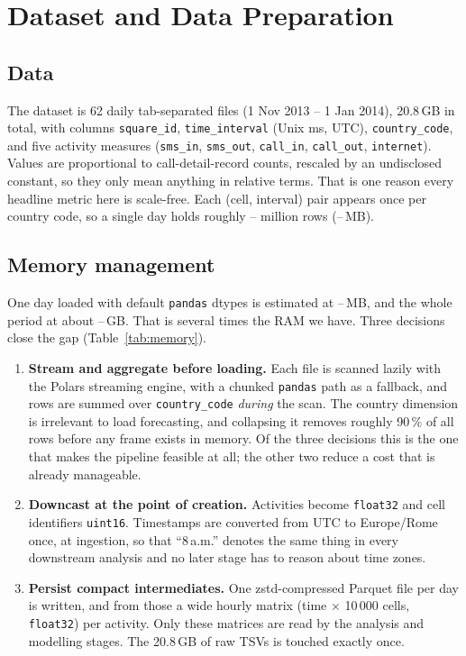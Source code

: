\documentclass[conference,onecolumn,11pt]{IEEEtran}
\providecommand{\naiveDayMB}{--}
\providecommand{\naiveAllGB}{--}
\providecommand{\rawDayMB}{--}
\providecommand{\rawRowsM}{--}
\begin{document}
\section{Dataset and Data Preparation}
\subsection{Data}
The dataset \cite{telecomitalia2015} is 62 daily tab-separated files (1 Nov 2013 -- 1 Jan 2014), 20.8\,GB in total, with columns \texttt{square\_id}, \texttt{time\_interval} (Unix ms, UTC), \texttt{country\_code}, and five activity measures (\texttt{sms\_in}, \texttt{sms\_out}, \texttt{call\_in}, \texttt{call\_out}, \texttt{internet}). Values are proportional to call-detail-record counts, rescaled by an undisclosed constant, so they only mean anything in relative terms. That is one reason every headline metric here is scale-free. Each (cell, interval) pair appears once per country code, so a single day holds roughly \rawRowsM{} million rows (\rawDayMB{}\,MB).

\subsection{Memory management}
One day loaded with default \texttt{pandas} dtypes is estimated at \naiveDayMB{}\,MB, and the whole period at about \naiveAllGB{}\,GB. That is several times the RAM we have. Three decisions close the gap (Table~\ref{tab:memory}).

\begin{enumerate}
\item \textbf{Stream and aggregate before loading.} Each file is scanned lazily with the Polars streaming engine, with a chunked \texttt{pandas} path as a fallback, and rows are summed over \texttt{country\_code} \emph{during} the scan. The country dimension is irrelevant to load forecasting, and collapsing it removes roughly 90\,\% of all rows before any frame exists in memory. Of the three decisions this is the one that makes the pipeline feasible at all; the other two reduce a cost that is already manageable.
\item \textbf{Downcast at the point of creation.} Activities become \texttt{float32} and cell identifiers \texttt{uint16}. Timestamps are converted from UTC to Europe/Rome once, at ingestion, so that ``8\,a.m.'' denotes the same thing in every downstream analysis and no later stage has to reason about time zones.
\item \textbf{Persist compact intermediates.} One zstd-compressed Parquet file per day is written, and from those a wide hourly matrix (time $\times$ 10\,000 cells, \texttt{float32}) per activity. Only these matrices are read by the analysis and modelling stages. The 20.8\,GB of raw TSVs is touched exactly once.
\end{enumerate}
\end{document}
